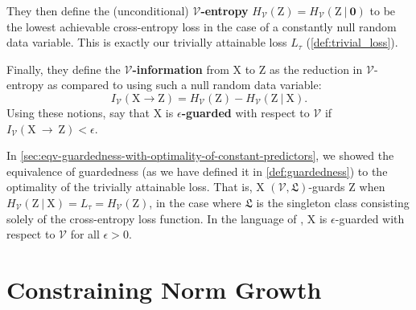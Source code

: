 \documentclass{article}
\theoremstyle{plain}
\theoremstyle{remark}
\newcommand{\Ltriv}{L_\tau}
\theoremstyle{plain}
\theoremstyle{TheoremNum}
\newcommand{\rv}[1]{{\mathrm{#1}}}
\begin{document}
They then define the (unconditional) \textbf{$\mathcal V$-entropy} $H_{\mathcal V}(\rv Z) = H_{\mathcal V}(\rv Z\ |\ \mathbf{0})$ to be the lowest achievable cross-entropy loss in the case of a constantly null random data variable. This is exactly our trivially attainable loss $\Ltriv$ (\cref{def:trivial_loss}).

Finally, they define the \textbf{$\mathcal V$-information} from $\rv X$ to $\rv Z$ as the reduction in $\mathcal V$-entropy as compared to using such a null random data variable:
\begin{equation*}
    I_{\mathcal V}(\rv X \to \rv Z) = H_{\mathcal V}(\rv Z) - H_{\mathcal V}(\rv Z\ |\ \rv X).
\end{equation*}
Using these notions, \citet{ravfogel2022linear} say that $\rv X$ is \textbf{$\epsilon$-guarded} with respect to $\mathcal V$ if $I_{\mathcal V}(\rv X~\to~\rv Z) < \epsilon$.

In \autoref{sec:eqv-guardedness-with-optimality-of-constant-predictors}, we showed the equivalence of guardedness (as we have defined it in \cref{def:guardedness}) to the optimality of the trivially attainable loss. That is, $\rv X$ $(\mathcal V, \mathfrak L)$-guards $\rv Z$ when $H_{\mathcal V}(\rv Z\ |\ \rv X) = \Ltriv = H_{\mathcal V}(\rv Z)$, in the case where $\mathfrak L$ is the singleton class consisting solely of the cross-entropy loss function. In the language of \cite{ravfogel2022linear}, $\rv X$ is $\epsilon$-guarded with respect to $\mathcal V$ for all $\epsilon > 0$.

\section{Constraining Norm Growth}\label{norm-growth}
\end{document}

